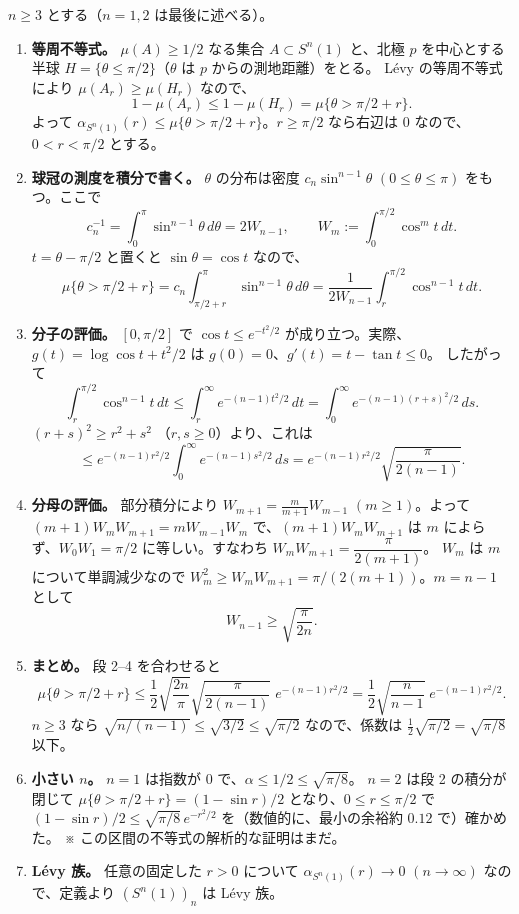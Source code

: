 $n \ge 3$ とする（$n = 1, 2$ は最後に述べる）。

\begin{enumerate}
\item \textbf{等周不等式。}
  $\mu(A) \ge 1/2$ なる集合 $A \subset S^n(1)$ と、北極 $p$ を中心とする半球 $H = \{\theta \le \pi/2\}$（$\theta$ は $p$ からの測地距離）をとる。
  Lévy の等周不等式により $\mu(A_r) \ge \mu(H_r)$ なので、
  \[
    1 - \mu(A_r) \le 1 - \mu(H_r) = \mu\{\theta > \pi/2 + r\}.
  \]
  よって $\alpha_{S^n(1)}(r) \le \mu\{\theta > \pi/2 + r\}$。$r \ge \pi/2$ なら右辺は $0$ なので、$0 < r < \pi/2$ とする。

\item \textbf{球冠の測度を積分で書く。}
  $\theta$ の分布は密度 $c_n \sin^{n-1}\theta$ $(0 \le \theta \le \pi)$ をもつ。ここで
  \[
    c_n^{-1} = \int_0^\pi \sin^{n-1}\theta\, d\theta = 2 W_{n-1},
    \qquad W_m := \int_0^{\pi/2} \cos^m t\, dt.
  \]
  $t = \theta - \pi/2$ と置くと $\sin\theta = \cos t$ なので、
  \[
    \mu\{\theta > \pi/2 + r\}
    = c_n \int_{\pi/2 + r}^{\pi} \sin^{n-1}\theta\, d\theta
    = \frac{1}{2 W_{n-1}} \int_r^{\pi/2} \cos^{n-1} t\, dt.
  \]

\item \textbf{分子の評価。}
  $[0, \pi/2]$ で $\cos t \le e^{-t^2/2}$ が成り立つ。実際、$g(t) = \log\cos t + t^2/2$ は $g(0) = 0$、$g'(t) = t - \tan t \le 0$。
  したがって
  \[
    \int_r^{\pi/2} \cos^{n-1} t\, dt
    \le \int_r^{\infty} e^{-(n-1)t^2/2}\, dt
    = \int_0^{\infty} e^{-(n-1)(r+s)^2/2}\, ds .
  \]
  $(r+s)^2 \ge r^2 + s^2$ （$r, s \ge 0$）より、これは
  \[
    \le e^{-(n-1)r^2/2} \int_0^\infty e^{-(n-1)s^2/2}\, ds
    = e^{-(n-1)r^2/2} \sqrt{\frac{\pi}{2(n-1)}}.
  \]

\item \textbf{分母の評価。}
  部分積分により $W_{m+1} = \frac{m}{m+1} W_{m-1}$ $(m \ge 1)$。よって $(m+1) W_m W_{m+1} = m W_{m-1} W_m$ で、$(m+1)W_mW_{m+1}$ は $m$ によらず、$W_0 W_1 = \pi/2$ に等しい。すなわち $W_m W_{m+1} = \dfrac{\pi}{2(m+1)}$。
  $W_m$ は $m$ について単調減少なので $W_m^2 \ge W_m W_{m+1} = \pi/(2(m+1))$。$m = n-1$ として
  \[
    W_{n-1} \ge \sqrt{\frac{\pi}{2n}}.
  \]

\item \textbf{まとめ。}
  段 2--4 を合わせると
  \[
    \mu\{\theta > \pi/2 + r\}
    \le \frac{1}{2}\sqrt{\frac{2n}{\pi}}\sqrt{\frac{\pi}{2(n-1)}}\; e^{-(n-1)r^2/2}
    = \frac{1}{2}\sqrt{\frac{n}{n-1}}\; e^{-(n-1)r^2/2}.
  \]
  $n \ge 3$ なら $\sqrt{n/(n-1)} \le \sqrt{3/2} \le \sqrt{\pi/2}$ なので、係数は $\frac12\sqrt{\pi/2} = \sqrt{\pi/8}$ 以下。

\item \textbf{小さい $n$。}
  $n = 1$ は指数が $0$ で、$\alpha \le 1/2 \le \sqrt{\pi/8}$。
  $n = 2$ は段 2 の積分が閉じて $\mu\{\theta > \pi/2 + r\} = (1 - \sin r)/2$ となり、$0 \le r \le \pi/2$ で $(1-\sin r)/2 \le \sqrt{\pi/8}\, e^{-r^2/2}$ を（数値的に、最小の余裕約 $0.12$ で）確かめた。
  ※ この区間の不等式の解析的な証明はまだ。

\item \textbf{Lévy 族。}
  任意の固定した $r > 0$ について $\alpha_{S^n(1)}(r) \to 0$ $(n \to \infty)$ なので、定義より $(S^n(1))_n$ は Lévy 族。
\end{enumerate}
